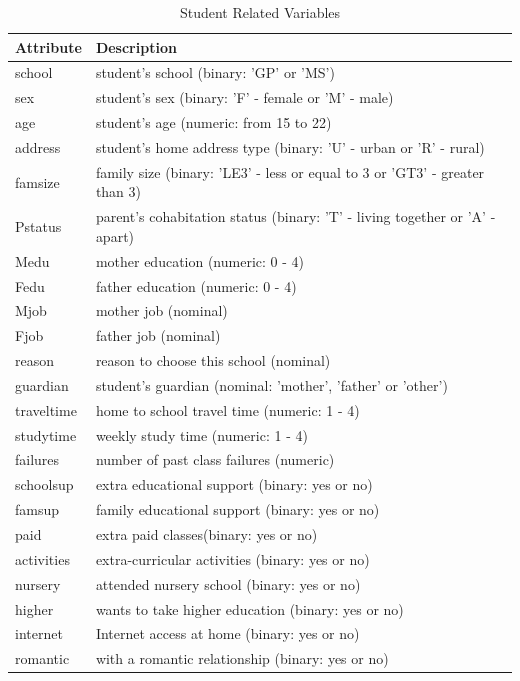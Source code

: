 \documentclass[conference]{IEEEtran}
\begin{document}
\begin{table}[htbp]
\caption{Student Related Variables}
\begin{center}
\begin{tabular}{|p{1cm}|p{7cm}|}
\hline
\textbf{Attribute} & \textbf{Description} \\
\hline
school&student's school (binary: 'GP'  or 'MS')\\
\hline
sex&student's sex (binary: 'F' - female or 'M' - male)\\
\hline
age&student's age (numeric: from 15 to 22)\\
\hline
address&student's home address type (binary: 'U' - urban or 'R' - rural)\\
\hline
famsize&family size (binary: 'LE3' - less or equal to 3 or 'GT3' - greater than 3)\\
\hline
Pstatus&parent's cohabitation status (binary: 'T' - living together or 'A' - apart)\\
\hline
Medu&mother education (numeric: 0 - 4)\\
\hline
Fedu&father education (numeric: 0 - 4)\\
\hline
Mjob&mother job (nominal)\\
\hline
Fjob&father job (nominal)\\
\hline
reason&reason to choose this school (nominal)\\
\hline
guardian&student's guardian (nominal: 'mother', 'father' or 'other')\\
\hline
traveltime&home to school travel time (numeric: 1 - 4)\\
\hline
studytime&weekly study time (numeric: 1 - 4)\\
\hline
failures&number of past class failures (numeric)\\
\hline
schoolsup&extra educational support (binary: yes or no)\\
\hline
famsup&family educational support (binary: yes or no)\\
\hline
paid&extra paid classes(binary: yes or no)\\
\hline
activities&extra-curricular activities (binary: yes or no)\\
\hline
nursery&attended nursery school (binary: yes or no)\\
\hline
higher&wants to take higher education (binary: yes or no)\\
\hline
internet&Internet access at home (binary: yes or no)\\
\hline
romantic&with a romantic relationship (binary: yes or no)\\

\end{tabular}
\end{center}
\end{table}
\end{document}
